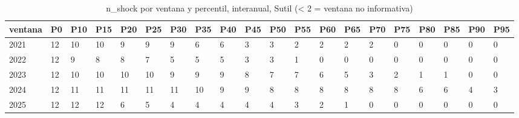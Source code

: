 \begin{table}[H]
\centering
\small
\caption{n\_shock por ventana y percentil, interanual, Sutil (< 2 = ventana no informativa)}
\label{tab:T_barrido_n_shock_interanual_sutil}
\begin{tabular}{llllllllllllllllllll}
\toprule
ventana & P0 & P10 & P15 & P20 & P25 & P30 & P35 & P40 & P45 & P50 & P55 & P60 & P65 & P70 & P75 & P80 & P85 & P90 & P95 \\
\midrule
2021 & 12 & 10 & 10 & 9 & 9 & 9 & 6 & 6 & 3 & 3 & 2 & 2 & 2 & 2 & 0 & 0 & 0 & 0 & 0 \\
2022 & 12 & 9 & 8 & 8 & 7 & 5 & 5 & 5 & 3 & 3 & 1 & 0 & 0 & 0 & 0 & 0 & 0 & 0 & 0 \\
2023 & 12 & 10 & 10 & 10 & 10 & 9 & 9 & 9 & 8 & 7 & 7 & 6 & 5 & 3 & 2 & 1 & 1 & 0 & 0 \\
2024 & 12 & 11 & 11 & 11 & 11 & 11 & 10 & 9 & 9 & 8 & 8 & 8 & 8 & 8 & 8 & 6 & 6 & 4 & 3 \\
2025 & 12 & 12 & 12 & 6 & 5 & 4 & 4 & 4 & 4 & 4 & 3 & 2 & 1 & 0 & 0 & 0 & 0 & 0 & 0 \\
\bottomrule
\end{tabular}
\end{table}